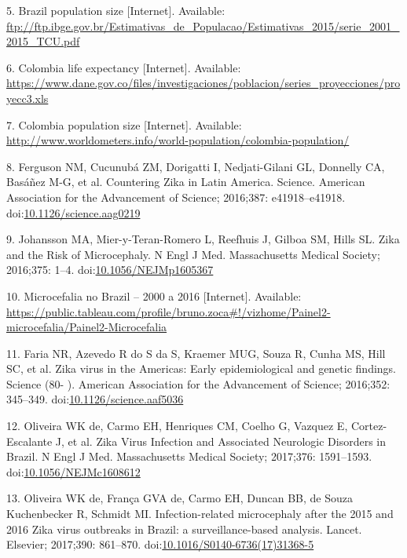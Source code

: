 \documentclass[10pt,letterpaper]{article}
\begin{document}
\hypertarget{ref-BahiaPopn}{}
5. Brazil population size {[}Internet{]}. Available:
\url{ftp://ftp.ibge.gov.br/Estimativas_de_Populacao/Estimativas_2015/serie_2001_2015_TCU.pdf}

\hypertarget{ref-ColombiaLifeExpectancy}{}
6. Colombia life expectancy {[}Internet{]}. Available:
\url{https://www.dane.gov.co/files/investigaciones/poblacion/series_proyecciones/proyecc3.xls}

\hypertarget{ref-ColombiaPopn}{}
7. Colombia population size {[}Internet{]}. Available:
\url{http://www.worldometers.info/world-population/colombia-population/}

\hypertarget{ref-Ferguson2016}{}
8. Ferguson NM, Cucunubá ZM, Dorigatti I, Nedjati-Gilani GL, Donnelly
CA, Basáñez M-G, et al. Countering Zika in Latin America. Science.
American Association for the Advancement of Science; 2016;387:
e41918--e41918.
doi:\href{https://doi.org/10.1126/science.aag0219}{10.1126/science.aag0219}

\hypertarget{ref-Johansson2016}{}
9. Johansson MA, Mier-y-Teran-Romero L, Reefhuis J, Gilboa SM, Hills SL.
Zika and the Risk of Microcephaly. N Engl J Med. Massachusetts Medical
Society; 2016;375: 1--4.
doi:\href{https://doi.org/10.1056/NEJMp1605367}{10.1056/NEJMp1605367}

\hypertarget{ref-Zoca2016}{}
10. Microcefalia no Brazil -- 2000 a 2016 {[}Internet{]}. Available:
\url{https://public.tableau.com/profile/bruno.zoca\#!/vizhome/Painel2-microcefalia/Painel2-Microcefalia}

\hypertarget{ref-Faria2016}{}
11. Faria NR, Azevedo R do S da S, Kraemer MUG, Souza R, Cunha MS, Hill
SC, et al. Zika virus in the Americas: Early epidemiological and genetic
findings. Science (80- ). American Association for the Advancement of
Science; 2016;352: 345--349.
doi:\href{https://doi.org/10.1126/science.aaf5036}{10.1126/science.aaf5036}

\hypertarget{ref-deOliveira2017}{}
12. Oliveira WK de, Carmo EH, Henriques CM, Coelho G, Vazquez E,
Cortez-Escalante J, et al. Zika Virus Infection and Associated
Neurologic Disorders in Brazil. N Engl J Med. Massachusetts Medical
Society; 2017;376: 1591--1593.
doi:\href{https://doi.org/10.1056/NEJMc1608612}{10.1056/NEJMc1608612}

\hypertarget{ref-deOliveira2017a}{}
13. Oliveira WK de, França GVA de, Carmo EH, Duncan BB, de Souza
Kuchenbecker R, Schmidt MI. Infection-related microcephaly after the
2015 and 2016 Zika virus outbreaks in Brazil: a surveillance-based
analysis. Lancet. Elsevier; 2017;390: 861--870.
doi:\href{https://doi.org/10.1016/S0140-6736(17)31368-5}{10.1016/S0140-6736(17)31368-5}
\end{document}
